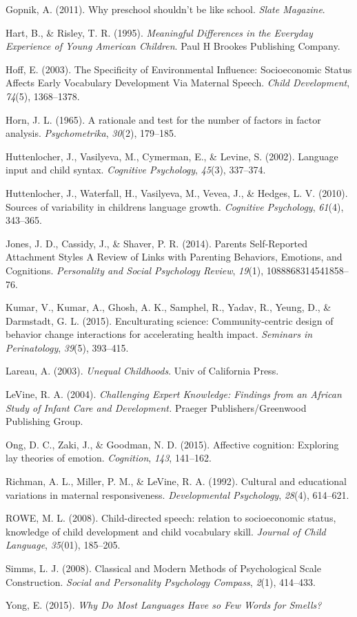 \documentclass[10pt, letterpaper]{article}
\begin{document}
Gopnik, A. (2011). Why preschool shouldn't be like school. \emph{Slate
Magazine}.

Hart, B., \& Risley, T. R. (1995). \emph{Meaningful Differences in the
Everyday Experience of Young American Children}. Paul H Brookes
Publishing Company.

Hoff, E. (2003). The Specificity of Environmental Influence:
Socioeconomic Status Affects Early Vocabulary Development Via Maternal
Speech. \emph{Child Development}, \emph{74}(5), 1368--1378.

Horn, J. L. (1965). A rationale and test for the number of factors in
factor analysis. \emph{Psychometrika}, \emph{30}(2), 179--185.

Huttenlocher, J., Vasilyeva, M., Cymerman, E., \& Levine, S. (2002).
Language input and child syntax. \emph{Cognitive Psychology},
\emph{45}(3), 337--374.

Huttenlocher, J., Waterfall, H., Vasilyeva, M., Vevea, J., \& Hedges, L.
V. (2010). Sources of variability in childrens language growth.
\emph{Cognitive Psychology}, \emph{61}(4), 343--365.

Jones, J. D., Cassidy, J., \& Shaver, P. R. (2014). Parents
Self-Reported Attachment Styles A Review of Links with Parenting
Behaviors, Emotions, and Cognitions. \emph{Personality and Social
Psychology Review}, \emph{19}(1), 1088868314541858--76.

Kumar, V., Kumar, A., Ghosh, A. K., Samphel, R., Yadav, R., Yeung, D.,
\& Darmstadt, G. L. (2015). Enculturating science: Community-centric
design of behavior change interactions for accelerating health impact.
\emph{Seminars in Perinatology}, \emph{39}(5), 393--415.

Lareau, A. (2003). \emph{Unequal Childhoods}. Univ of California Press.

LeVine, R. A. (2004). \emph{Challenging Expert Knowledge: Findings from
an African Study of Infant Care and Development.} Praeger
Publishers/Greenwood Publishing Group.

Ong, D. C., Zaki, J., \& Goodman, N. D. (2015). Affective cognition:
Exploring lay theories of emotion. \emph{Cognition}, \emph{143},
141--162.

Richman, A. L., Miller, P. M., \& LeVine, R. A. (1992). Cultural and
educational variations in maternal responsiveness. \emph{Developmental
Psychology}, \emph{28}(4), 614--621.

ROWE, M. L. (2008). Child-directed speech: relation to socioeconomic
status, knowledge of child development and child vocabulary skill.
\emph{Journal of Child Language}, \emph{35}(01), 185--205.

Simms, L. J. (2008). Classical and Modern Methods of Psychological Scale
Construction. \emph{Social and Personality Psychology Compass},
\emph{2}(1), 414--433.

Yong, E. (2015). \emph{Why Do Most Languages Have so Few Words for
Smells?}
\end{document}
